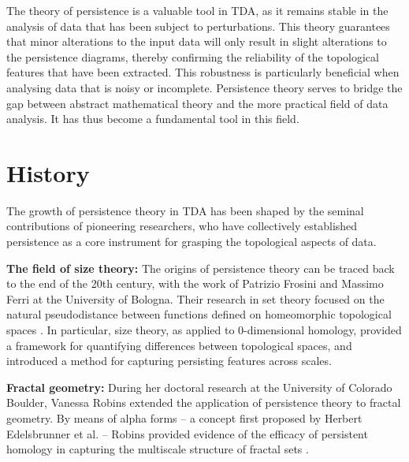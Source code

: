 The theory of persistence is a valuable tool in TDA, as it remains stable in the analysis of data that has been subject to perturbations. This theory guarantees that minor alterations to the input data will only result in slight alterations to the persistence diagrams, thereby confirming the reliability of the topological features that have been extracted. This robustness is particularly beneficial when analysing data that is noisy or incomplete. Persistence theory serves to bridge the gap between abstract mathematical theory and the more practical field of data analysis. It has thus become a fundamental tool in this field.

\section{History}
The growth of persistence theory in TDA has been shaped by the seminal contributions of pioneering researchers, who have collectively established persistence as a core instrument for grasping the topological aspects of data.

\textbf{The field of size theory:} The origins of persistence theory can be traced back to the end of the 20th century, with the work of Patrizio Frosini and Massimo Ferri at the University of Bologna. Their research in set theory focused on the natural pseudodistance between functions defined on homeomorphic topological spaces \cite{Frosini1999,Ferri1998}. In particular, size theory, as applied to $0$-dimensional homology, provided a framework for quantifying differences between topological spaces, and introduced a method for capturing persisting features across scales.

\textbf{Fractal geometry:} During her doctoral research at the University of Colorado Boulder, Vanessa Robins extended the application of persistence theory to fractal geometry. By means of alpha forms -- a concept first proposed by Herbert Edelsbrunner et al. -- Robins provided evidence of the efficacy of persistent homology in capturing the multiscale structure of fractal sets \cite{Robins2000, Edelsbrunner1994}.


